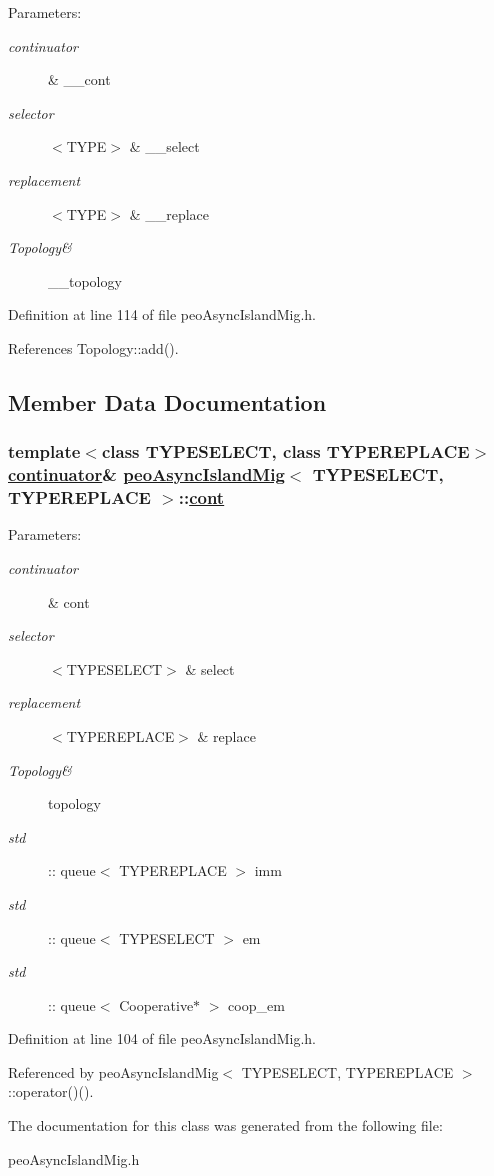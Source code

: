 \begin{Desc}
\item[Parameters:]
\begin{description}
\item[{\em continuator}]\& \_\-\_\-cont \item[{\em selector}]$<$TYPE$>$ \& \_\-\_\-select \item[{\em replacement}]$<$TYPE$>$ \& \_\-\_\-replace \item[{\em Topology\&}]\_\-\_\-topology \end{description}
\end{Desc}


Definition at line 114 of file peo\-Async\-Island\-Mig.h.

References Topology::add().

\subsection{Member Data Documentation}
\hypertarget{classpeoAsyncIslandMig_b7a4049f66f99f9e7ec5c785042ee06a}{
\subsubsection[cont]{\setlength{\rightskip}{0pt plus 5cm}template$<$class TYPESELECT, class TYPEREPLACE$>$ \hyperlink{classcontinuator}{continuator}\& \hyperlink{classpeoAsyncIslandMig}{peo\-Async\-Island\-Mig}$<$ TYPESELECT, TYPEREPLACE $>$::\hyperlink{classpeoAsyncIslandMig_b7a4049f66f99f9e7ec5c785042ee06a}{cont}}}
\label{classpeoAsyncIslandMig_b7a4049f66f99f9e7ec5c785042ee06a}


\begin{Desc}
\item[Parameters:]
\begin{description}
\item[{\em continuator}]\& cont \item[{\em selector}]$<$TYPESELECT$>$ \& select \item[{\em replacement}]$<$TYPEREPLACE$>$ \& replace \item[{\em Topology\&}]topology \item[{\em std}]:: queue$<$ TYPEREPLACE $>$ imm \item[{\em std}]:: queue$<$ TYPESELECT $>$ em \item[{\em std}]:: queue$<$ Cooperative$\ast$ $>$ coop\_\-em \end{description}
\end{Desc}


Definition at line 104 of file peo\-Async\-Island\-Mig.h.

Referenced by peo\-Async\-Island\-Mig$<$ TYPESELECT, TYPEREPLACE $>$::operator()().

The documentation for this class was generated from the following file:\begin{CompactItemize}
\item 
peo\-Async\-Island\-Mig.h\end{CompactItemize}
